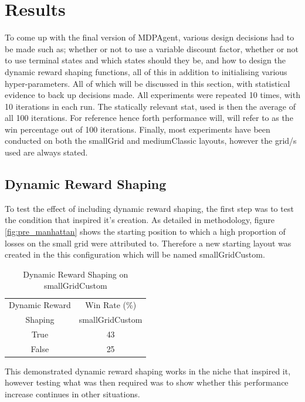 \documentclass[letterpaper, 11pt, journal, final]{IEEEtran}
\begin{document}
\section{Results}
To come up with the final version of MDPAgent, various design decisions had to be made such as; whether or not to use a variable discount factor, whether or not to use terminal states and which states should they be, and how to design the dynamic reward shaping functions, all of this in addition to initialising various hyper-parameters. All of which will be discussed in this section, with statistical evidence to back up decisions made. All experiments were repeated 10 times, with 10 iterations in each run. The statically relevant stat, used is then the average of all 100  iterations. For reference hence forth performance will, will refer to as the win percentage out of 100 iterations. Finally, most experiments have been conducted on both the smallGrid and mediumClassic layouts, however the grid/s used are always stated.

\subsection{Dynamic Reward Shaping}
To test the effect of including dynamic reward shaping, the first step was to test the condition that inspired it's creation. As detailed in methodology, figure \ref{fig:pre_manhattan} shows the starting position to which a high proportion of losses on the small grid were attributed to. Therefore a new starting layout was created in the this configuration which will be named smallGridCustom.

\begin{table}[h!]
\centering
\caption{Dynamic Reward Shaping on smallGridCustom}
\begin{tabular}{ c || c } 
 \hline
  Dynamic Reward & Win Rate (\%) \\
  \cline{2-2}
  Shaping & smallGridCustom \\
 \hline
 \cellcolor{blue!18}True & \cellcolor{blue!18}43 \\ [0.5ex]
 False & 25\\ [0.5ex]
 \hline
\end{tabular}
\end{table}

This demonstrated dynamic reward shaping works in the niche that inspired it, however testing what was then required was to show whether this performance increase continues in other situations.
\end{document}

